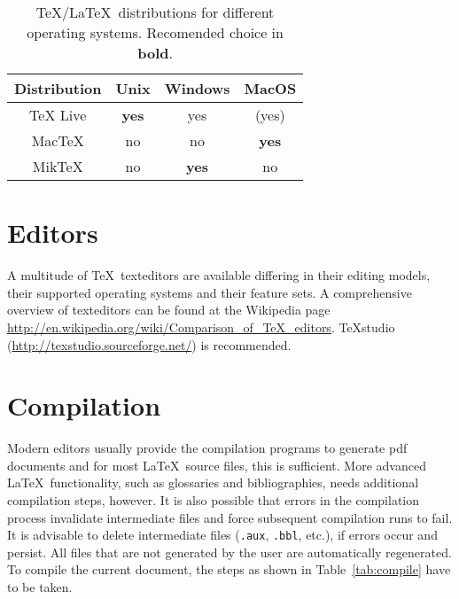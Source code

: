 \begin{table}
	\centering
	\begin{tabular}{cccc}
		\toprule
		Distribution & Unix         & Windows      & MacOS        \\
		\midrule
		TeX Live     & \textbf{yes} & yes          & (yes)        \\
		MacTeX       & no           & no           & \textbf{yes} \\
		MikTeX       & no           & \textbf{yes} & no           \\
		\bottomrule
	\end{tabular}
	\caption{\TeX/\LaTeX\ distributions for different operating systems. Recomended choice in \textbf{bold}.}
	\label{tab:distrib} %
\end{table}

\section{Editors}

A multitude of \TeX\ \glspl{texteditor} are available differing in their editing models, their supported operating systems and their feature sets.
A comprehensive overview of \glspl{texteditor} can be found at the Wikipedia page  \url{http://en.wikipedia.org/wiki/Comparison_of_TeX_editors}.
TeXstudio (\url{http://texstudio.sourceforge.net/}) is recommended.

\section{Compilation}

Modern editors usually provide the compilation programs to generate \gls{pdf} documents and for most \LaTeX\ source files, this is sufficient.
More advanced \LaTeX\ functionality, such as glossaries and bibliographies, needs additional compilation steps, however.
It is also possible that errors in the compilation process invalidate intermediate files and force subsequent compilation runs to fail.
It is advisable to delete intermediate files (\verb|.aux|, \verb|.bbl|, etc.), if errors occur and persist.
All files that are not generated by the user are automatically regenerated.
To compile the current document, the steps as shown in Table~\ref{tab:compile} have to be taken.


